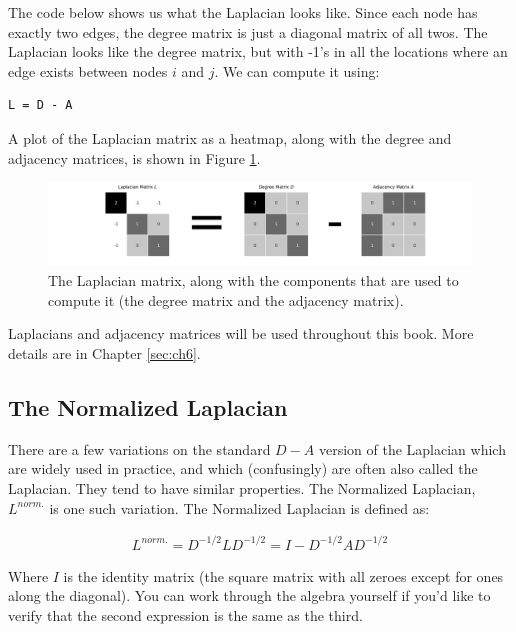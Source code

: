 The code below shows us what the Laplacian looks like. Since each node has exactly two edges, the degree matrix is just a diagonal matrix of all twos. The Laplacian looks like the degree matrix, but with -1's in all the locations where an edge exists between nodes $i$ and $j$. We can compute it using:

\begin{lstlisting}[style=python]
L = D - A
\end{lstlisting}

A plot of the Laplacian matrix as a heatmap, along with the degree and adjacency matrices, is shown in Figure \ref{fig:ch4:simple_lap}.
\begin{figure}[h]
    \centering
    \includegraphics[width=\linewidth]{representations/ch4/Images/simple_lapl.png}
    \caption[Laplacian matrix]{The Laplacian matrix, along with the components that are used to compute it (the degree matrix and the adjacency matrix).}
    \label{fig:ch4:simple_lap}
\end{figure}

Laplacians and adjacency matrices will be used throughout this book. More details are in Chapter \ref{sec:ch6}.

\subsection{The Normalized Laplacian}
\label{sec:ch4:mat-rep:normlapl}

There are a few variations on the standard $D-A$ version of the Laplacian which are widely used in practice, and which (confusingly) are often also called the Laplacian. They tend to have similar properties. The Normalized Laplacian, $L^{norm.}$ is one such variation. The Normalized Laplacian \cite{Chung1996Dec} is defined as:

\begin{align*}
    L^{norm.} = D^{-1/2} L D^{-1/2} = I - D^{-1/2} A D^{-1/2}
\end{align*}

Where $I$ is the identity matrix (the square matrix with all zeroes except for ones along the diagonal). You can work through the algebra yourself if you'd like to verify that the second expression is the same as the third.


